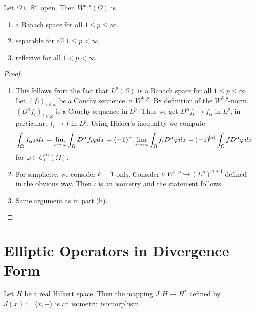 \begin{theorem}
	Let $\Omega \subseteq \mathbb{R}^n$ open. Then $W^{k,p}(\Omega)$ is
	\begin{enumerate}[label = \textup{(}\alph*\textup{)},wide = 0pt]
		\item a Banach space for all $1 \leq p \leq \infty$.
		\item separable for all $1 \leq p < \infty$.
		\item reflexive for all $1 < p < \infty$.
	\end{enumerate}
\end{theorem}

\begin{proof}
	~
	\begin{enumerate}[label = \textup{(}\alph*\textup{)},wide = 0pt]
		\item This follows from the fact that $L^p(\Omega)$ is a Banach space for all $1 \leq p \leq \infty$. Let $(f_i)_{i \in \omega}$ be a Cauchy sequence in $W^{k,p}$. By definition of the $W^{k,p}$-norm, $(D^\alpha f_i)_{i \in \omega}$ is a Cauchy sequence in $L^p$. Thus we get $D^\alpha f_i \to f_\alpha$ in $L^p$, in particular, $f_i \to f$ in $L^p$. Using H\"older's inequality we compute
			\begin{equation*}
				\int_\Omega f_\alpha \varphi dx = \lim_{i \to \infty} \int_\Omega D^\alpha f_i \varphi dx = (-1)^{\abs{\alpha}} \lim_{i \to \infty}\int_\Omega f_i D^\alpha \varphi dx = (-1)^{\abs{\alpha}}\int_\Omega f D^\alpha \varphi dx
			\end{equation*}
			\noindent for $\varphi \in C^\infty_c(\Omega)$.
		\item For simplicity, we consider $k = 1$ only. Consider $\iota : W^{1,p} \hookrightarrow (L^p)^{n + 1}$ defined in the obvious way. Then $\iota$ is an isometry and the statement follows. 
		\item Same argument as in part (b).
	\end{enumerate}
\end{proof}

\section*{Elliptic Operators in Divergence Form}

\begin{lemma}
	\label{lem:PI}
\end{lemma}

\begin{theorem}
	\label{thm:RRT}
	Let $H$ be a real Hilbert space. Then the mapping $J : H \to H^*$ defined by $J(x) := \langle x,-\rangle$ is an isometric isomorphism.
\end{theorem}

